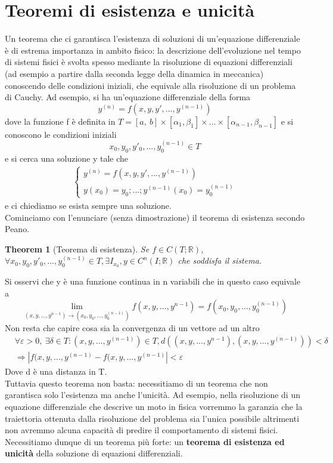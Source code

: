\documentclass[10pt,a4paper]{article}
\newtheorem{theorem}{Theorem}
\begin{document}
\section{Teoremi di esistenza e unicità}
Un teorema che ci garantisca l'esistenza di soluzioni di un'equazione differenziale è di estrema importanza in ambito fisico: la descrizione dell'evoluzione nel tempo di sistemi fisici è svolta spesso mediante la risoluzione di equazioni differenziali (ad esempio a partire dalla seconda legge della dinamica in meccanica) conoscendo delle condizioni iniziali, che equivale alla risoluzione di un problema di Cauchy. Ad esempio, si ha un'equazione differenziale della forma
\[y^{(n)}=f(x,y,y',...,y^{(n-1)})\]
dove la funzione f è definita in \(T=[a,\ b]\times[\alpha_1,\beta_1]\times...\times[\alpha_{n-1},\beta_{n-1}]\)
e si conoscono le condizioni iniziali
\[{x_0,y_0,y'_0,...,y^{(n-1)}_0}\in T\]
e si cerca una soluzione y tale che
\begin{align}\label{sis:prob_cauchy}
	\begin{cases}
		y^{(n)}=f(x,y,y',...,y^{(n-1)})\\
		y(x_0)=y_0;...;y^{(n-1)}(x_0)=y^{(n-1)}_0
	\end{cases}
\end{align} 
e ci chiediamo se esista sempre una soluzione.\\
Cominciamo con l'enunciare (senza dimostrazione) il teorema di esistenza secondo Peano.
\begin{theorem}[Teorema di esistenza]
	Se \(f\in C(T;\mathbb{R})\), $\forall {x_0,y_0,y'_0,...,y^{(n-1)}_0}\in T, \exists I_{x_0}, y\in C^n(I; \mathbb{R})$ che soddisfa il sistema. 
\end{theorem}
Si osservi che y è una funzione continua in n variabili che in questo caso equivale a
\[\lim_{(x,y,...,y^{n-1})\to(x_0,y_0,...,y^{(n-1)}_0)}f(x,y,...,y^{n-1})=f(x_0,y_0,...,y^{(n-1)}_0)\]
Non resta che capire cosa sia la convergenza di un vettore ad un altro
\begin{align*}
	&\forall\varepsilon>0,\ \exists \delta\in T: (x,y,...,y^{(n-1)})\in T, d\left((x,y,...,y^{n-1}),(x,y,...,y^{(n-1)})\right)<\delta\\
	 &\Rightarrow |f(x,y,...,y^{(n-1)}-f(x,y,...,y^{(n-1)}|<\varepsilon
\end{align*}
Dove d è una distanza in T.\\
Tuttavia questo teorema non basta: necessitiamo di un teorema che non garantisca solo l'esistenza ma anche l'unicità. Ad esempio, nella risoluzione di un equazione differenziale che descrive un moto in fisica vorremmo la garanzia che la traiettoria ottenuta dalla risoluzione del problema sia l'unica possibile altrimenti non avremmo alcuna capacità di predire il comportamento di sistemi fisici. Necessitiamo dunque di un teorema più forte: un \textbf{teorema di esistenza ed unicità} della soluzione di equazioni differenziali.\\
\end{document}
